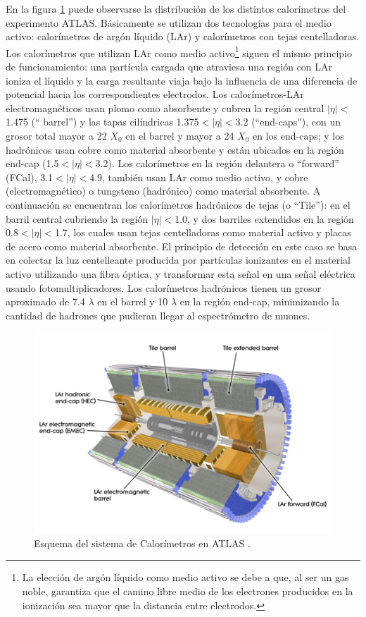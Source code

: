 En la figura \ref{fig:Calo} puede observarse la distribución de los distintos calorímetros del experimento ATLAS. Básicamente se utilizan dos tecnologías para el medio activo: calorímetros de argón líquido (LAr) y calorímetros con tejas centelladoras.
Los calorímetros que utilizan LAr como medio activo\footnote{La elección de argón líquido como medio activo se debe a que, al ser un gas noble, garantiza que el camino libre medio de los electrones producidos en la ionización sea mayor que la distancia entre electrodos.} siguen el mismo principio de funcionamiento: una partícula cargada que atraviesa una región con LAr ioniza el líquido y la carga resultante viaja bajo la influencia de una diferencia de potencial hacia los correspondientes electrodos. Los calorímetros-LAr electromagnéticos usan plomo como absorbente y cubren la región central $|\eta|<$1.475 (`` barrel'') y las tapas cilíndricas 1.375$<|\eta|<$3.2 (``end-caps''), con un grosor total mayor a 22 $X_0$ en el barrel  y mayor a 24 $X_0$ en los end-caps; y los hadrónicos usan cobre como material absorbente y están ubicados en la región end-cap (1.5$<|\eta|<$3.2). Los calorímetros en la región delantera o ``forward'' (FCal), 3.1$<|\eta|<$4.9, también usan LAr como medio activo, y cobre (electromagnético) o tungsteno (hadrónico) como material absorbente. A continuación se encuentran los calorímetros hadrónicos de tejas (o ``Tile''): en el barril central cubriendo la región $|\eta|<$1.0, y dos barriles extendidos en la región 0.8$<|\eta|<$1.7, los cuales usan tejas centelladoras como material activo y placas de acero como material absorbente. El principio de detección en este caso se basa en colectar la luz centelleante producida por partículas ionizantes en el material activo utilizando una fibra óptica, y transformar esta señal en una señal eléctrica usando fotomultiplicadores. Los calorímetros hadrónicos tienen un grosor aproximado de 7.4 $\lambda$ en el barrel y 10 $\lambda$ en la región end-cap, minimizando la cantidad de hadrones que pudieran llegar al espectrómetro de muones. \\

\begin{figure}[h]
    \centering
    \includegraphics[width =0.7\linewidth]{images/Calo}
    \caption{Esquema del sistema de Calorímetros en ATLAS \cite{Calo}.}
    \label{fig:Calo}
\end{figure}

